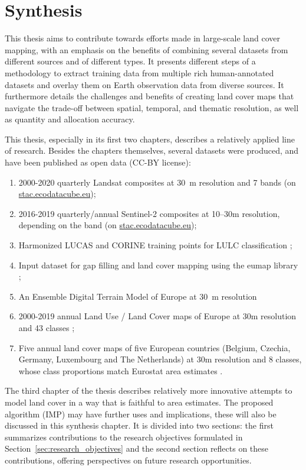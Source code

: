 \chapter[Synthesis]{Synthesis}
\label{cha:Chapter6}
\newpage

This thesis aims to contribute towards efforts made in large-scale land cover mapping, with an emphasis on the benefits of combining several datasets from different sources and of different types. It presents different steps of a methodology to extract training data from multiple rich human-annotated datasets and overlay them on Earth observation data from diverse sources. It furthermore details the challenges and benefits of creating land cover maps that navigate the trade-off between spatial, temporal, and thematic resolution, as well as quantity and allocation accuracy.

This thesis, especially in its first two chapters, describes a relatively applied line of research. Besides the chapters themselves, several datasets were produced, and have been published as open data (CC-BY license):
\begin{enumerate}
    \item 2000-2020 quarterly Landsat composites at 30~m resolution and 7 bands (on \url{stac.ecodatacube.eu});
    \item 2016-2019 quarterly/annual Sentinel-2 composites at 10--30m resolution, depending on the band (on \url{stac.ecodatacube.eu});
    \item Harmonized LUCAS and CORINE training points for LULC classification \citep{landa2021multi};
    \item Input dataset for gap filling and land cover mapping using the eumap library \citep{parente2020input};
    \item An Ensemble Digital Terrain Model of Europe at 30~m resolution \citep{hengl2021continental}
    \item 2000-2019 annual Land Use / Land Cover maps of Europe at 30m resolution and 43 classes \citep{parente2021continental};
    \item Five annual land cover maps of five European countries (Belgium, Czechia, Germany, Luxembourg and The Netherlands) at 30m resolution and 8 classes, whose class proportions match Eurostat area estimates \citep{witjes2024iterative_data}.
\end{enumerate}
The third chapter of the thesis describes relatively more innovative attempts to model land cover in a way that is faithful to area estimates. The proposed algorithm (IMP) may have further uses and implications, these will also be discussed in this synthesis chapter. It is divided into two sections: the first summarizes contributions to the research objectives formulated in Section~\ref{sec:research_objectives} and the second section reflects on these contributions, offering perspectives on future research opportunities. 

